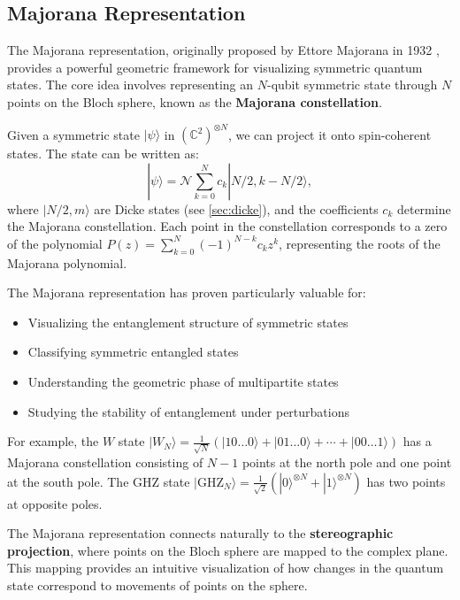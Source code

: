 \documentclass[%
 amsmath,amssymb,
 aps,
rmp,
]{revtex4-2}
\begin{document}
\subsection{Majorana Representation}
\label{sec:majorana}

The Majorana representation, originally proposed by Ettore Majorana in 1932 \cite{majorana1932atomi}, provides a powerful geometric framework for visualizing symmetric quantum states. The core idea involves representing an $N$-qubit symmetric state through $N$ points on the Bloch sphere, known as the \textbf{Majorana constellation}.

Given a symmetric state $|\psi\rangle$ in $(\mathbb{C}^2)^{\otimes N}$, we can project it onto spin-coherent states. The state can be written as:
\begin{equation}
	|\psi\rangle = \mathcal{N} \sum_{k=0}^{N} c_k |N/2, k - N/2\rangle,
\end{equation}
where $|N/2, m\rangle$ are Dicke states (see \cref{sec:dicke}), and the coefficients $c_k$ determine the Majorana constellation. Each point in the constellation corresponds to a zero of the polynomial $P(z) = \sum_{k=0}^{N} (-1)^{N-k} c_k z^k$, representing the roots of the Majorana polynomial.

The Majorana representation has proven particularly valuable for:
\begin{itemize}
	\item Visualizing the entanglement structure of symmetric states
	\item Classifying symmetric entangled states
	\item Understanding the geometric phase of multipartite states
	\item Studying the stability of entanglement under perturbations
\end{itemize}

For example, the $W$ state $|W_N\rangle = \frac{1}{\sqrt{N}}(|10\ldots 0\rangle + |01\ldots 0\rangle + \cdots + |00\ldots 1\rangle)$ has a Majorana constellation consisting of $N-1$ points at the north pole and one point at the south pole. The GHZ state $|\text{GHZ}_N\rangle = \frac{1}{\sqrt{2}}(|0\rangle^{\otimes N} + |1\rangle^{\otimes N})$ has two points at opposite poles.

The Majorana representation connects naturally to the \textbf{stereographic projection}, where points on the Bloch sphere are mapped to the complex plane. This mapping provides an intuitive visualization of how changes in the quantum state correspond to movements of points on the sphere.
\end{document}
